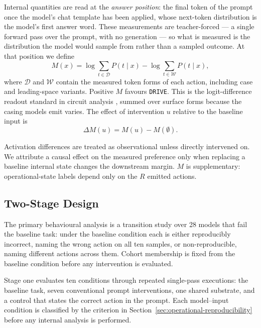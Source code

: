 Internal quantities are read at the \emph{answer position}: the final
token of the prompt once the model's chat template has been applied,
whose next-token distribution is the model's first answer word. These
measurements are teacher-forced --- a single forward pass over the
prompt, with no generation --- so what is measured is the distribution
the model would sample from rather than a sampled outcome. At that
position we define
\begin{equation}
    M(x) = \log \sum_{t \in \mathcal{D}} P(t \mid x)
         - \log \sum_{t \in \mathcal{W}} P(t \mid x),
    \label{eq:decision-margin}
\end{equation}
where $\mathcal{D}$ and $\mathcal{W}$ contain the measured token forms
of each action, including case and leading-space variants. Positive
$M$ favours \texttt{DRIVE}. This is the logit-difference readout
standard in circuit analysis \citep{wang2023interpretability}, summed
over surface forms because the casing models emit varies. The effect of intervention $u$ relative
to the baseline input is
\begin{equation}
    \Delta M(u) = M(u) - M(\emptyset).
    \label{eq:intervention-effect}
\end{equation}

Activation differences are treated as observational unless directly
intervened on. We attribute a causal effect on the measured preference
only when replacing a baseline internal state changes the downstream
margin. $M$ is supplementary: operational-state labels depend only on
the $R$ emitted actions.


\subsection{Two-Stage Design}
\label{sec:two-stage-design}

The primary behavioural analysis is a transition study over 28 models
that fail the baseline task: under the baseline condition each is
either reproducibly incorrect, naming the wrong action on all ten
samples, or non-reproducible, naming different actions across them.
Cohort membership is fixed from the baseline condition before any
intervention is evaluated.

Stage one evaluates ten conditions through repeated single-pass
executions: the baseline task, seven conventional prompt
interventions, one shared substrate, and a control that states the
correct action in the prompt. Each model--input condition is classified by the criterion
in Section~\ref{sec:operational-reproducibility} before any internal
analysis is performed.

